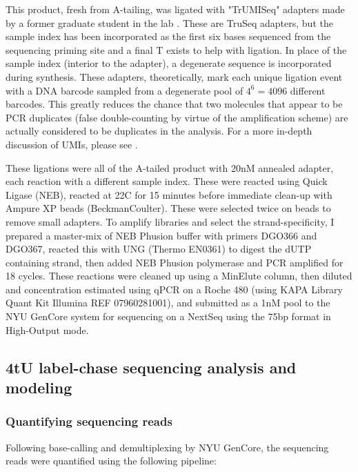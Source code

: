 This product, fresh from A-tailing, was ligated with "TrUMISeq"
adapters made by a former graduate student in the lab
\parencite{hong2017method}. These are TruSeq adapters, but the
sample index has been incorporated as the first six bases sequenced
from the sequencing priming site and a final T exists to help with
ligation. In place of the sample index (interior to the adapter),
a degenerate sequence is incorporated during synthesis.
These adapters, theoretically, mark each unique ligation event
with a DNA barcode sampled from a degenerate pool of $4^6 = 4096$
different barcodes. This greatly reduces the chance that two
molecules that appear to be PCR duplicates (false double-counting
by virtue of the amplification scheme) are actually considered
to be duplicates in the analysis. For a more in-depth discussion of
UMIs, please see
.

These ligations were all of the A-tailed product with 20nM annealed
adapter, each reaction with a different sample index. These were
reacted using Quick Ligase (NEB), reacted at 22C for 15 minutes
before immediate clean-up with Ampure XP beads (BeckmanCoulter).
These were selected twice on beads to remove small adapters.
To amplify libraries and select the strand-specificity, I prepared a
master-mix of NEB Phusion buffer with primers DGO366 and DGO367,
reacted this with UNG (Thermo EN0361) to digest the dUTP containing
strand, then added NEB Phusion polymerase and PCR amplified for
18 cycles.
These reactions were cleaned up using a MinElute column, then diluted
and concentration estimated using qPCR on a Roche 480 (using KAPA
Library Quant Kit Illumina REF 07960281001), and submitted as a 1nM pool
to the NYU GenCore system for sequencing on a NextSeq using the 75bp
format in High-Output mode.

\subsection{4tU label-chase sequencing analysis and modeling}

\subsubsection{Quantifying sequencing reads}

Following base-calling and demultiplexing by NYU GenCore, the sequencing
reads were quantified using the following pipeline:

